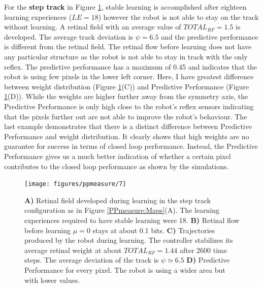 For the \textbf{step track} in Figure \ref{PPmeasure:step}, stable learning
is accomplished after eighteen learning experiences ($LE=18$) however the robot
is not able to stay on the track without learning.
A retinal field with an average value of $TOTAL_{RF}=1.5$ is developed.
The average track deviation is $\psi=6.5$ and the predictive performance is different
from the retinal field. The retinal flow before learning does not have any particular structure as the robot is not able to stay in track
with the only reflex. The predictive performance has a maximum of 0.45 and indicates that the robot is using few pixels in the lower 
left corner.
Here, I have greatest difference between weight
distribution (Figure \ref{PPmeasure:step}(C)) and Predictive Performance (Figure \ref{PPmeasure:step}(D)).
While the weights are higher further away from the symmetry axis, the Predictive Performance is
only high close to the robot’s reﬂex sensors indicating that the pixels further out
are not able to improve the robot’s behaviour.
The last example demonstrates that there is a distinct difference between Predictive
Performance and weight distribution. It clearly shows that high weights
are no guarantee for success in terms of closed loop performance. Instead, the
Predictive Performance gives us a much better indication of whether a certain
pixel contributes to the closed loop performance as shown by the simulations.

\begin{figure}[!hbt]
	\begin{center}
		\texttt{[image: figures/ppmeasure/7]}
	\end{center}
	\caption[Performance for the step track]{
	{\bf A)} Retinal field developed during learning in the step track configuration as in Figure \ref{PPmeasure:Maps}(A).
		      The learning experiences required to have stable learning were 18.
	{\bf B)} Retinal flow before learning $\mu=0$ stays at about 0.1 bits. 
	{\bf C)} Trajectories produced by the robot during learning. The controller stabilizes its average retinal weight at about $TOTAL_{RF}=1.44$ after 2600 time steps. The average deviation of the track is $\psi \simeq 6.5$  
	{\bf D)} Predictive Performance for every pixel. The robot is using a wider area but with lower values. \label{PPmeasure:step}}
\end{figure}

